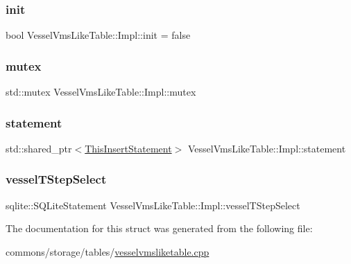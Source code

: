 \subsubsection{\texorpdfstring{init}{init}}
{\footnotesize\ttfamily bool Vessel\+Vms\+Like\+Table\+::\+Impl\+::init = false}

\mbox{\label{struct_vessel_vms_like_table_1_1_impl_a419a7a93322a5d6a75adb93801ae7a31}} 
\subsubsection{\texorpdfstring{mutex}{mutex}}
{\footnotesize\ttfamily std\+::mutex Vessel\+Vms\+Like\+Table\+::\+Impl\+::mutex}

\mbox{\label{struct_vessel_vms_like_table_1_1_impl_a45743178ec286f79fb2836fb5e3de3e6}} 
\subsubsection{\texorpdfstring{statement}{statement}}
{\footnotesize\ttfamily std\+::shared\+\_\+ptr$<$\mbox{\hyperlink{struct_vessel_vms_like_table_1_1_impl_aef1b507be7f680a656e5604c3049a99a}{This\+Insert\+Statement}}$>$ Vessel\+Vms\+Like\+Table\+::\+Impl\+::statement}

\mbox{\label{struct_vessel_vms_like_table_1_1_impl_a8f24333e77de604f1b082c6f0b422aa7}} 
\subsubsection{\texorpdfstring{vesselTStepSelect}{vesselTStepSelect}}
{\footnotesize\ttfamily sqlite\+::\+S\+Q\+Lite\+Statement Vessel\+Vms\+Like\+Table\+::\+Impl\+::vessel\+T\+Step\+Select}



The documentation for this struct was generated from the following file\+:\begin{DoxyCompactItemize}
\item 
commons/storage/tables/\mbox{\hyperlink{vesselvmsliketable_8cpp}{vesselvmsliketable.\+cpp}}\end{DoxyCompactItemize}
